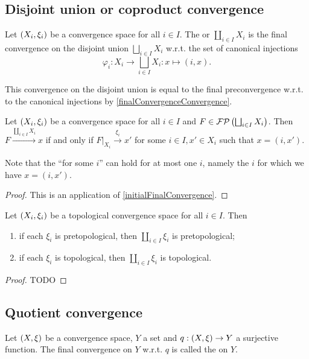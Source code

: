 \subsection{Disjoint union or coproduct convergence}
\begin{definition}
Let $\sSet{X_i, \xi_i}$ be a convergence space for all $i\in I$. The  or  $\coprod_{i\in I}X_i$ is the final convergence on the disjoint union $\bigsqcup_{i\in I}X_i$ w.r.t. the set of canonical injections
\[ \varphi_i: X_i \to \bigsqcup_{i\in I}X_i: x\mapsto (i, x). \]
\end{definition}
This convergence on the disjoint union is equal to the final preconvergence w.r.t. to the canonical injections by \ref{finalConvergenceConvergence}.

\begin{proposition}
Let $\sSet{X_i, \xi_i}$ be a convergence space for all $i\in I$ and $F\in\operatorname{\mathcal{FP}}\left(\bigsqcup_{i\in I}X_i\right)$. Then $F\overset{\coprod_{i\in I}X_i}{\longrightarrow} x$ \textup{if and only if} $F|_{X_i} \overset{\xi_i}{\longrightarrow} x'$ for some $i\in I, x'\in X_i$ such that $x= (i,x')$.
\end{proposition}
Note that the ``for some $i$'' can hold for at most one $i$, namely the $i$ for which we have $x = (i, x')$.
\begin{proof}
This is an application of \ref{initialFinalConvergence}.
\end{proof}

\begin{proposition} \label{pretopologicalCoproductConvergence}
Let $\sSet{X_i, \xi_i}$ be a topological convergence space for all $i\in I$. Then
\begin{enumerate}
\item if each $\xi_i$ is pretopological, then $\coprod_{i\in I} \xi_i$ is pretopological;
\item if each $\xi_i$ is topological, then $\coprod_{i\in I} \xi_i$ is topological.
\end{enumerate}
\end{proposition}
\begin{proof}
TODO
\end{proof}

\subsection{Quotient convergence}
\begin{definition}
Let $\sSet{X,\xi}$ be a convergence space, $Y$ a set and $q: \sSet{X,\xi}\to Y$ a surjective function. The final convergence on $Y$ w.r.t. $q$ is called the  on $Y$.
\end{definition}

